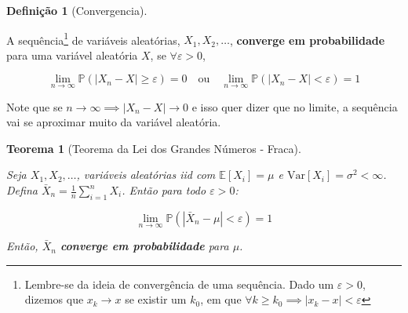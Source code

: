 \documentclass[
  letterpaper,
  DIV=11,
  numbers=noendperiod]{scrreprt}
\theoremstyle{definition}
\newtheorem{definition}{Definição}[chapter]
\theoremstyle{plain}
\newtheorem{theorem}{Teorema}[chapter]
\theoremstyle{remark}
\begin{document}
\begin{definition}[Convergencia]\protect\hypertarget{def-converg}{}\label{def-converg}

A sequência\footnote{Lembre-se da ideia de convergência de uma
  sequência. Dado um \(\varepsilon > 0\), dizemos que \(x_{k} \to x\) se
  existir um \(k_0\), em que
  \(\forall k \geq k_0 \implies |x_{k} - x| < \varepsilon\)} de
variáveis aleatórias, \(X_{1}, X_{2}, \ldots\), \textbf{converge em
probabilidade} para uma variável aleatória \(X\), se
\(\forall \varepsilon > 0\),

\[
\lim_{n \to \infty} \mathbb{P}(\left|X_{n} - X\right| \geq \varepsilon) = 0 \quad \text{ou} \quad \lim_{n \to \infty} \mathbb{P}(\left|X_{n} - X\right| < \varepsilon) = 1
\]

Note que se \(n \to \infty \implies \left|X_{n} - X\right| \to 0\) e
isso quer dizer que no limite, a sequência vai se aproximar muito da
variável aleatória.

\end{definition}

\begin{theorem}[Teorema da Lei dos Grandes Números -
Fraca]\protect\hypertarget{thm-lei-grande-numero}{}\label{thm-lei-grande-numero}

Seja \(X_{1}, X_{2}, \ldots\), variáveis aleatórias iid com
\(\mathbb{E}[X_{i}] = \mu\) e
\(\text{Var}[X_{i}] = \sigma^{2} < \infty\). Defina
\(\bar{X}_{n} = \frac{1}{n} \sum_{i=1}^{n} X_{i}\). Então para todo
\(\varepsilon > 0\):

\[
\lim_{n \to \infty} \mathbb{P}(|\bar{X}_{n} - \mu| < \varepsilon) = 1
\]

Então, \(\bar{X}_{n}\) \textbf{converge em probabilidade} para \(\mu\).

\end{theorem}
\end{document}
